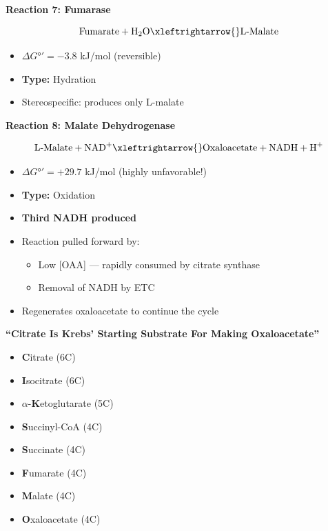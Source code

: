 \textbf{Reaction 7: Fumarase}

\[
\text{Fumarate} + \text{H}_2\text{O} \xleftrightarrow{} \text{L-Malate}
\]

\begin{itemize}
    \item $\Delta G°' = -3.8$ kJ/mol (reversible)
    \item \textbf{Type:} Hydration
    \item Stereospecific: produces only L-malate
\end{itemize}

\textbf{Reaction 8: Malate Dehydrogenase}

\[
\text{L-Malate} + \text{NAD}^+ \xleftrightarrow{} \text{Oxaloacetate} + \text{NADH} + \text{H}^+
\]

\begin{itemize}
    \item $\Delta G°' = +29.7$ kJ/mol (highly unfavorable!)
    \item \textbf{Type:} Oxidation
    \item \textbf{Third NADH produced}
    \item Reaction pulled forward by:
    \begin{itemize}
        \item Low [OAA] — rapidly consumed by citrate synthase
        \item Removal of NADH by ETC
    \end{itemize}
    \item Regenerates oxaloacetate to continue the cycle
\end{itemize}

\begin{tcolorbox}[colback=blue!5, colframe=blue!70!black, title=\textbf{Memory Aid: TCA Cycle Intermediates}]
\textbf{``Citrate Is Krebs' Starting Substrate For Making Oxaloacetate''}

\begin{itemize}
    \item \textbf{C}itrate (6C)
    \item \textbf{I}socitrate (6C)
    \item $\alpha$-\textbf{K}etoglutarate (5C)
    \item \textbf{S}uccinyl-CoA (4C)
    \item \textbf{S}uccinate (4C)
    \item \textbf{F}umarate (4C)
    \item \textbf{M}alate (4C)
    \item \textbf{O}xaloacetate (4C)
\end{itemize}
\end{tcolorbox}

